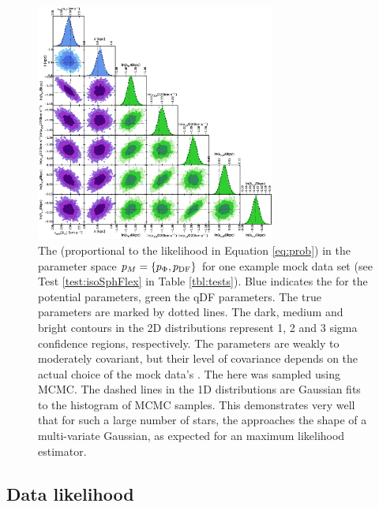 
\begin{figure}[!htbp]
\centering
\includegraphics[width=0.7\textwidth]{figs/isoSphFlex_short_hot_2kpc_triangle_MCMC.eps}
\caption{The \pdf{} (proportional to the likelihood in Equation \ref{eq:prob}) in the parameter space $p_M{} = \{p_\Phi,p_\text{DF}\}$ for one example mock data set (see Test \ref{test:isoSphFlex} in Table \ref{tbl:tests}). Blue indicates the \pdf{} for the potential parameters, green the qDF parameters. The true parameters are marked by dotted lines. The dark, medium and bright contours in the 2D distributions represent 1, 2 and 3 sigma confidence regions, respectively. The parameters are weakly to moderately covariant, but their level of covariance depends on the actual choice of the mock data's \pmodel{}. The \pdf{} here was sampled using MCMC. The dashed lines in the 1D distributions are Gaussian fits to the histogram of MCMC samples. This demonstrates very well that for such a large number of stars, the \pdf{} approaches the shape of a multi-variate Gaussian, as expected for an maximum likelihood estimator. \Wilma{[TO DO: $\text{km s}^{-1}$]}}
\label{fig:isoSphFlex_triangleplot}
\end{figure}



\subsection{Data likelihood} \label{sec:likelihood}



